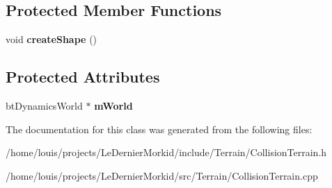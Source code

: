 \subsection*{Protected Member Functions}
\begin{DoxyCompactItemize}
\item 
\mbox{\label{class_collision_terrain_a0641937303366dd4576a5ad308513e9b}} 
void {\bfseries create\+Shape} ()
\end{DoxyCompactItemize}
\subsection*{Protected Attributes}
\begin{DoxyCompactItemize}
\item 
\mbox{\label{class_collision_terrain_a51867cf4e61b0170fdbe81b7b7a84870}} 
bt\+Dynamics\+World $\ast$ {\bfseries m\+World}
\end{DoxyCompactItemize}


The documentation for this class was generated from the following files\+:\begin{DoxyCompactItemize}
\item 
/home/louis/projects/\+Le\+Dernier\+Morkid/include/\+Terrain/Collision\+Terrain.\+h\item 
/home/louis/projects/\+Le\+Dernier\+Morkid/src/\+Terrain/Collision\+Terrain.\+cpp\end{DoxyCompactItemize}
